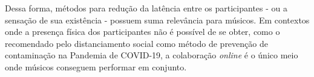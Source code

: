 Dessa forma, métodos para redução da latência entre os participantes - ou a sensação de sua existência - possuem suma relevância para músicos. Em contextos onde a presença física dos participantes não é possível de se obter, como o recomendado pelo distanciamento social como método de prevenção de contaminação na Pandemia de COVID-19, a colaboração \textit{online} é o único meio onde músicos conseguem performar em conjunto.